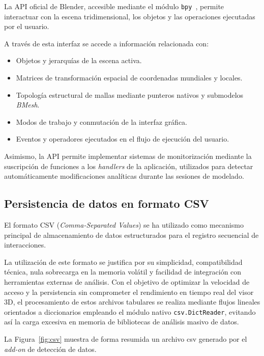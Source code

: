 La API oficial de Blender, accesible mediante el módulo \texttt{bpy}~\cite{blenderapi}, permite interactuar con la escena tridimensional, los objetos y las operaciones ejecutadas por el usuario.

A través de esta interfaz se accede a información relacionada con:
\begin{itemize}
\item Objetos y jerarquías de la escena activa.
\item Matrices de transformación espacial de coordenadas mundiales y locales.
\item Topología estructural de mallas mediante punteros nativos y submodelos \textit{BMesh}.
\item Modos de trabajo y conmutación de la interfaz gráfica.
\item Eventos y operadores ejecutados en el flujo de ejecución del usuario.
\end{itemize}

Asimismo, la API permite implementar sistemas de monitorización mediante la suscripción de funciones a los \textit{handlers} de la aplicación, utilizados para detectar automáticamente modificaciones analíticas durante las sesiones de modelado.

\subsection{Persistencia de datos en formato CSV}

El formato CSV (\textit{Comma-Separated Values}) se ha utilizado como mecanismo principal de almacenamiento de datos estructurados para el registro secuencial de interacciones.

La utilización de este formato se justifica por su simplicidad, compatibilidad técnica, nula sobrecarga en la memoria volátil y facilidad de integración con herramientas externas de análisis. Con el objetivo de optimizar la velocidad de acceso y la persistencia sin comprometer el rendimiento en tiempo real del visor 3D, el procesamiento de estos archivos tabulares se realiza mediante flujos lineales orientados a diccionarios empleando el módulo nativo \texttt{csv.DictReader}, evitando así la carga excesiva en memoria de bibliotecas de análisis masivo de datos.

La Figura~\ref{fig:csv} muestra de forma resumida un archivo csv generado por el \textit{add-on} de detección de datos.

